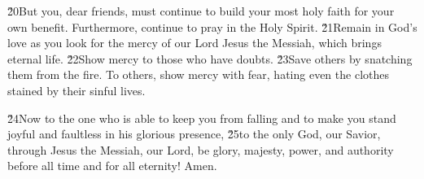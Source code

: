 \v{20}But you, dear friends, must continue to build your most holy faith for your own benefit. Furthermore, continue to pray in the Holy Spirit. \v{21}Remain in God's love as you look for the mercy of our Lord Jesus the Messiah, which brings eternal life. \v{22}Show mercy to those who have doubts. \v{23}Save others by snatching them from the fire. To others, show mercy with fear, hating even the clothes stained by their sinful lives.

\v{24}Now to the one who is able to keep you from falling and to make you stand joyful and faultless in his glorious presence, \v{25}to the only God, our Savior, through Jesus the Messiah, our Lord, be glory, majesty, power, and authority before all time and for all eternity! Amen.
